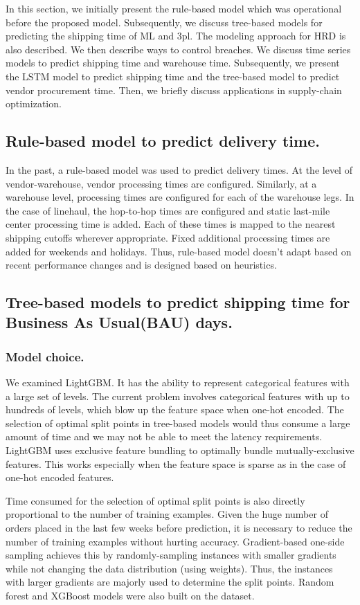 \documentclass[twoside,leqno,twocolumn]{article}
\begin{document}
In this section, we initially present the rule-based model which was operational before the proposed model. Subsequently, we discuss tree-based models for predicting the shipping time of ML and 3pl. The modeling approach for HRD is also described. We then describe ways to control breaches. We discuss time series models to predict shipping time and warehouse time. Subsequently, we present the LSTM model to predict shipping time and the tree-based model to predict vendor procurement time. Then, we briefly discuss applications in supply-chain optimization.

\subsection{Rule-based model to predict delivery time.}
In the past, a rule-based model was used to predict delivery times. At the level of vendor-warehouse, vendor processing times are configured. Similarly, at a warehouse level, processing times are configured for each of the warehouse legs. In the case of linehaul, the hop-to-hop times are configured and static last-mile center processing time is added. Each of these times is mapped to the nearest shipping cutoffs wherever appropriate. Fixed additional processing times are added for weekends and holidays. Thus, rule-based model doesn't adapt based on recent performance changes and is designed based on heuristics.

\subsection{Tree-based models to predict shipping time for Business As Usual(BAU) days.}
\subsubsection{Model choice.}
We examined LightGBM\cite{ke2017lightgbm}. It has the ability to represent categorical features with a large set of levels. The current problem involves categorical features with up to hundreds of levels, which blow up the feature space when one-hot encoded. The selection of optimal split points in tree-based models would thus consume a large amount of time and we may not be able to meet the latency requirements. LightGBM uses exclusive feature bundling to optimally bundle mutually-exclusive features. This works especially when the feature space is sparse as in the case of one-hot encoded features.

Time consumed for the selection of optimal split points is also directly proportional to the number of training examples. Given the huge number of orders placed in the last few weeks before prediction, it is necessary to reduce the number of training examples without hurting accuracy. Gradient-based one-side sampling\cite{ke2017lightgbm} achieves this by randomly-sampling instances with smaller gradients while not changing the data distribution (using weights). Thus, the instances with larger gradients are majorly used to determine the split points. Random forest and XGBoost models were also built on the dataset. 
\end{document}

